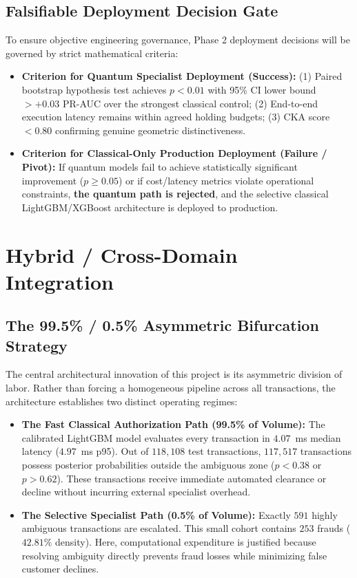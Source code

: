 \documentclass[10pt,a4paper]{article}
\begin{document}
\subsection{Falsifiable Deployment Decision Gate}
To ensure objective engineering governance, Phase 2 deployment decisions will be governed by strict mathematical criteria:
\begin{itemize}[leftmargin=*,itemsep=0.4pt,topsep=1pt]
\item \textbf{Criterion for Quantum Specialist Deployment (Success):} (1) Paired bootstrap hypothesis test achieves $p < 0.01$ with 95\% CI lower bound $> +0.03$ PR-AUC over the strongest classical control; (2) End-to-end execution latency remains within agreed holding budgets; (3) CKA score $< 0.80$ confirming genuine geometric distinctiveness.
\item \textbf{Criterion for Classical-Only Production Deployment (Failure / Pivot):} If quantum models fail to achieve statistically significant improvement ($p \ge 0.05$) or if cost/latency metrics violate operational constraints, \textbf{the quantum path is rejected}, and the selective classical LightGBM/XGBoost architecture is deployed to production.
\end{itemize}

\section{Hybrid / Cross-Domain Integration}

\subsection{The 99.5\% / 0.5\% Asymmetric Bifurcation Strategy}
The central architectural innovation of this project is its asymmetric division of labor. Rather than forcing a homogeneous pipeline across all transactions, the architecture establishes two distinct operating regimes:
\begin{itemize}[leftmargin=*,itemsep=0.4pt,topsep=1pt]
\item \textbf{The Fast Classical Authorization Path (99.5\% of Volume):} The calibrated LightGBM model evaluates every transaction in $4.07$~ms median latency ($4.97$~ms p95). Out of $118,108$ test transactions, $117,517$ transactions possess posterior probabilities outside the ambiguous zone ($p < 0.38$ or $p > 0.62$). These transactions receive immediate automated clearance or decline without incurring external specialist overhead.
\item \textbf{The Selective Specialist Path (0.5\% of Volume):} Exactly $591$ highly ambiguous transactions are escalated. This small cohort contains $253$ frauds ($42.81\%$ density). Here, computational expenditure is justified because resolving ambiguity directly prevents fraud losses while minimizing false customer declines.
\end{itemize}
\end{document}
